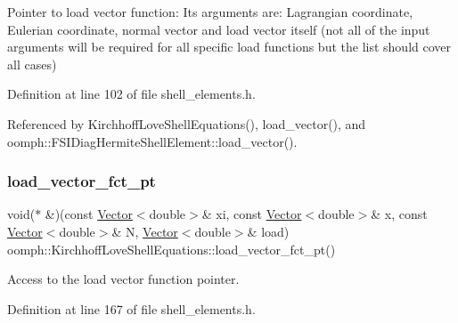 Pointer to load vector function\+: Its arguments are\+: Lagrangian coordinate, Eulerian coordinate, normal vector and load vector itself (not all of the input arguments will be required for all specific load functions but the list should cover all cases) 



Definition at line 102 of file shell\+\_\+elements.\+h.



Referenced by Kirchhoff\+Love\+Shell\+Equations(), load\+\_\+vector(), and oomph\+::\+F\+S\+I\+Diag\+Hermite\+Shell\+Element\+::load\+\_\+vector().

\mbox{\label{classoomph_1_1KirchhoffLoveShellEquations_a92a3f04077bfcfa5d0a7879003d93801}} 
\subsubsection{\texorpdfstring{load\+\_\+vector\+\_\+fct\+\_\+pt}{load\_vector\_fct\_pt}}
{\footnotesize\ttfamily void($\ast$ \&)(const \hyperlink{classoomph_1_1Vector}{Vector}$<$double$>$\& xi, const \hyperlink{classoomph_1_1Vector}{Vector}$<$double$>$\& x, const \hyperlink{classoomph_1_1Vector}{Vector}$<$double$>$\& N, \hyperlink{classoomph_1_1Vector}{Vector}$<$double$>$\& load) oomph\+::\+Kirchhoff\+Love\+Shell\+Equations\+::load\+\_\+vector\+\_\+fct\+\_\+pt()\hspace{0.3cm}{\ttfamily [inline]}}



Access to the load vector function pointer. 



Definition at line 167 of file shell\+\_\+elements.\+h.

\mbox{\label{classoomph_1_1KirchhoffLoveShellEquations_a8e22a8093db86c446cca68b3db60d6a4}} 
